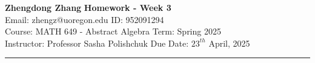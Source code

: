 \documentclass[a4paper, 12pt]{article}
\begin{document}
\noindent
\large\textbf{Zhengdong Zhang} \hfill \textbf{Homework - Week 3}   \\
Email: zhengz@uoregon.edu \hfill ID: 952091294 \\
\normalsize Course: MATH 649 - Abstract Algebra  \hfill Term: Spring 2025\\
Instructor: Professor Sasha Polishchuk \hfill Due Date: $23^{th}$ April, 2025 \\
\noindent\rule{7in}{2.8pt}
\end{document}
